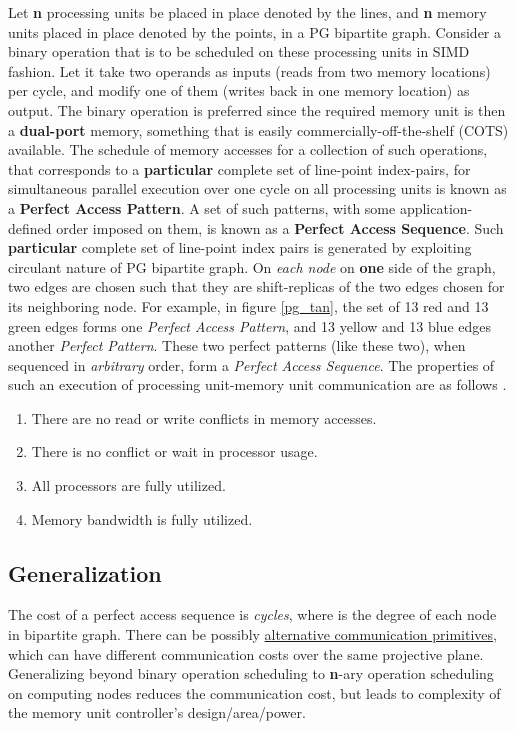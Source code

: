 \documentclass[12pt]{article}
\begin{document}
Let {\large \textbf{n}} processing units be placed in place denoted by the
lines, and {\large \textbf{n}} memory units placed in place denoted by the
points, in a PG bipartite graph. Consider a binary operation that is to be
scheduled on these processing units in SIMD fashion. Let it take two
operands as inputs (reads from two memory locations) per cycle, and modify
one of them (writes back in one memory location) as output. The binary
operation is preferred since the required memory
unit is then a \textbf{dual-port} memory, something that is easily
commercially-off-the-shelf (COTS) available. The schedule of
memory accesses for a collection of such operations, that corresponds to a
\textbf{particular} complete set of line-point index-pairs, for
simultaneous parallel execution over one cycle on all processing units is
known as a \textbf{Perfect Access Pattern}. A set of such patterns, with
some application-defined order imposed on them, is known as a
\textbf{Perfect Access Sequence}. Such \textbf{particular} complete set of
line-point index pairs is generated by exploiting circulant nature of PG
bipartite graph. On \textit{each node} on \textbf{one} side of the graph, two edges are
chosen such that they are shift-replicas of the two edges chosen for its
neighboring node.  For example, in figure \ref{pg_tan}, the set of 13 red
and 13 green edges forms one \textit{Perfect Access Pattern}, and 13 yellow
and 13 blue edges another \textit{Perfect Pattern}. These two perfect
patterns (like these two), when sequenced in \textit{arbitrary} order,
form a \textit{Perfect Access Sequence}.  The properties of such an
execution of processing
unit-memory unit communication are as follows \cite{karm1}.
\begin{enumerate}
\item There are no read or write conflicts in memory accesses.
\item There is no conflict or wait in processor usage.
\item All processors are fully utilized.
\item Memory bandwidth is fully utilized.
\end{enumerate}

\subsection{Generalization}
The cost of a perfect access sequence is \textit{{\large
} cycles}, where {\large } is
the degree of each node in bipartite graph. There
can be possibly \uline{alternative communication primitives}, which can
have different communication costs over the same projective plane.
Generalizing
beyond binary operation scheduling to \textbf{n}-ary operation scheduling on
computing nodes reduces the communication cost, but leads to complexity
of the memory unit controller's design/area/power.
\end{document}
